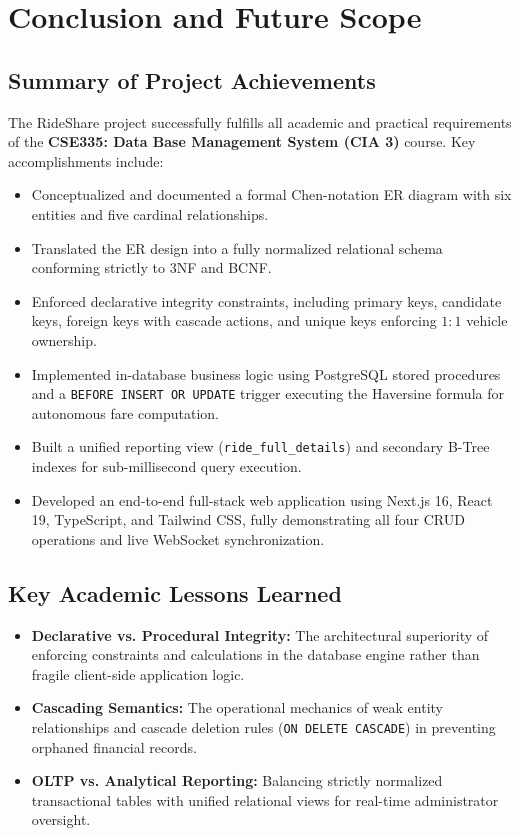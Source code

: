 \chapter{Conclusion and Future Scope}

\section{Summary of Project Achievements}
The RideShare project successfully fulfills all academic and practical requirements of the \textbf{CSE335: Data Base Management System (CIA 3)} course. Key accomplishments include:
\begin{itemize}[itemsep=1.5pt, topsep=2pt, parsep=0pt]
    \item Conceptualized and documented a formal Chen-notation ER diagram with six entities and five cardinal relationships.
    \item Translated the ER design into a fully normalized relational schema conforming strictly to 3NF and BCNF.
    \item Enforced declarative integrity constraints, including primary keys, candidate keys, foreign keys with cascade actions, and unique keys enforcing $1:1$ vehicle ownership.
    \item Implemented in-database business logic using PostgreSQL stored procedures and a \texttt{BEFORE INSERT OR UPDATE} trigger executing the Haversine formula for autonomous fare computation.
    \item Built a unified reporting view (\texttt{ride\_full\_details}) and secondary B-Tree indexes for sub-millisecond query execution.
    \item Developed an end-to-end full-stack web application using Next.js 16, React 19, TypeScript, and Tailwind CSS, fully demonstrating all four CRUD operations and live WebSocket synchronization.
\end{itemize}

\section{Key Academic Lessons Learned}
\begin{itemize}[itemsep=1.5pt, topsep=2pt, parsep=0pt]
    \item \textbf{Declarative vs. Procedural Integrity:} The architectural superiority of enforcing constraints and calculations in the database engine rather than fragile client-side application logic.
    \item \textbf{Cascading Semantics:} The operational mechanics of weak entity relationships and cascade deletion rules (\texttt{ON DELETE CASCADE}) in preventing orphaned financial records.
    \item \textbf{OLTP vs. Analytical Reporting:} Balancing strictly normalized transactional tables with unified relational views for real-time administrator oversight.
\end{itemize}

